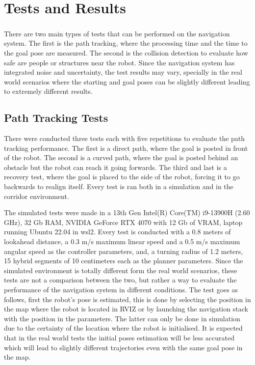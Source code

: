 
%

\chapter{Tests and Results}
\label{cha:tests_and_results}

\paragraph{}There are two main types of tests that can be performed on the navigation 
system. The first is the path tracking, where the processing time and the time 
to the goal pose are measured. The second is the collision detection to evaluate 
how safe are people or structures near the robot.
Since the navigation system has integrated noise and uncertainty, the test 
results may vary, specially in the real world scenarios where the starting 
and goal poses can be slightly different leading to extremely different results.

\section{Path Tracking Tests}
\label{sec:path_tracking_tests}
There were conducted three tests each with five repetitions to evaluate 
the path tracking performance. The first is a direct path, where the goal is 
posted in front of the robot. The second is a curved path, where the goal is posted 
behind an obstacle but the robot can reach it going forwards. The third and last 
is a recovery test, where the goal is placed to the side of the robot, forcing 
it to go backwards to realign itself. Every test is ran both in a simulation and 
in the corridor environment.

The simulated tests were made in a 13th Gen Intel(R) Core(TM) i9-13900H (2.60 GHz), 32 Gb RAM, 
NVIDIA GeForce RTX 4070 with 12 Gb of VRAM, laptop running Ubuntu 22.04 in wsl2.
Every test is conducted with a 0.8 meters of lookahead distance, a 0.3 m/s maximum linear 
speed and a 0.5 m/s maximum angular speed as the controller parameters, and, 
a turning radius of 1.2 meters, 15 hybrid segments of 10 centimeters each as the 
planner parameters.
Since the simulated environment is totally different form the real world scenarios, 
these tests are not a comparison between the two, but rather a way to evaluate 
the performance of the navigation system in different conditions.
The test goes as follows, first the robot's pose is estimated, this is done by selecting 
the position in the map where the robot is located in RVIZ or by launching the 
navigation stack with the position in the parameters. The latter can only be done 
in simulation due to the certainty of the location where the robot is initialised. It is 
expected that in the real world tests the initial poses estimation will be less 
accurated which will lead to slightly different trajectories even with the same goal 
pose in the map.
\clearpage
